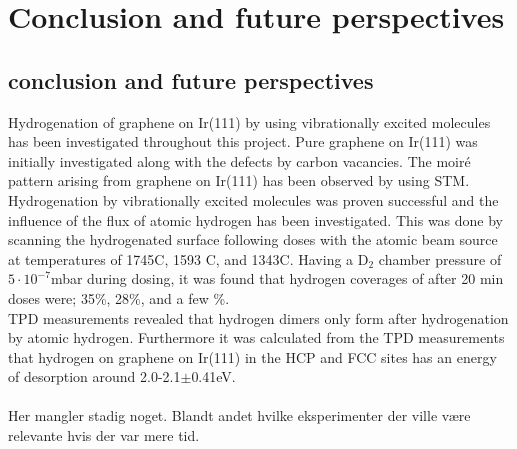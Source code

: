 \chapter{Conclusion and future perspectives}

\section{conclusion and future perspectives}
Hydrogenation of graphene on Ir(111) by using vibrationally excited molecules has been investigated throughout this project. Pure graphene on Ir(111) was initially investigated along with the defects by carbon vacancies. The moiré pattern arising from graphene on Ir(111) has been observed by using STM. Hydrogenation by vibrationally excited molecules was proven successful and the influence of the flux of atomic hydrogen has been investigated. This was done by scanning the hydrogenated surface following doses with the atomic beam source at temperatures of 1745\degree C, 1593 \degree C, and 1343\degree C. Having a D$_2$ chamber pressure of $5 \cdot 10^{-7}$mbar during dosing, it was found that hydrogen coverages of after 20 min doses were; 35\%, 28\%, and a few \%.\\
TPD measurements revealed that hydrogen dimers only form after hydrogenation by atomic hydrogen. Furthermore it was calculated from the TPD measurements that hydrogen on graphene on Ir(111) in the HCP and FCC sites has an energy of desorption around 2.0-2.1$\pm$0.41eV. \\
\\
Her mangler stadig noget. Blandt andet hvilke eksperimenter der ville være relevante hvis der var mere tid.
